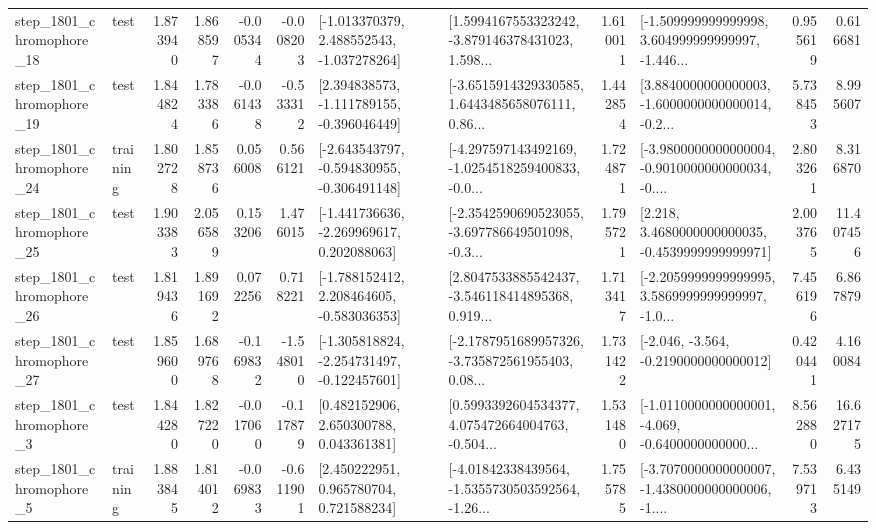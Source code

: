\begin{tabular}{llrrrrllrlrr}
 step\_1801\_chromophore\_18 &      test &      1.873940 &    1.868597 &     -0.005344 & -0.008203 &   [-1.013370379, 2.488552543, -1.037278264] &  [1.5994167553323242, -3.879146378431023, 1.598... &       1.610011 &  [-1.509999999999998, 3.604999999999997, -1.446... &            0.955619 &          0.616681 \\
 step\_1801\_chromophore\_19 &      test &      1.844824 &    1.783386 &     -0.061438 & -0.533312 &   [2.394838573, -1.111789155, -0.396046449] &  [-3.6515914329330585, 1.6443485658076111, 0.86... &       1.442854 &  [3.8840000000000003, -1.6000000000000014, -0.2... &            5.738453 &          8.995607 \\
 step\_1801\_chromophore\_24 &  training &      1.802728 &    1.858736 &      0.056008 &  0.566121 &  [-2.643543797, -0.594830955, -0.306491148] &  [-4.297597143492169, -1.0254518259400833, -0.0... &       1.724871 &  [-3.9800000000000004, -0.9010000000000034, -0.... &            2.803261 &          8.316870 \\
 step\_1801\_chromophore\_25 &      test &      1.903383 &    2.056589 &      0.153206 &  1.476015 &   [-1.441736636, -2.269969617, 0.202088063] &  [-2.3542590690523055, -3.697786649501098, -0.3... &       1.795721 &   [2.218, 3.4680000000000035, -0.4539999999999971] &            2.003765 &         11.407456 \\
 step\_1801\_chromophore\_26 &      test &      1.819436 &    1.891692 &      0.072256 &  0.718221 &   [-1.788152412, 2.208464605, -0.583036353] &  [2.8047533885542437, -3.546118414895368, 0.919... &       1.713417 &  [-2.2059999999999995, 3.5869999999999997, -1.0... &            7.456196 &          6.867879 \\
 step\_1801\_chromophore\_27 &      test &      1.859600 &    1.689768 &     -0.169832 & -1.548010 &  [-1.305818824, -2.254731497, -0.122457601] &  [-2.1787951689957326, -3.735872561955403, 0.08... &       1.731422 &              [-2.046, -3.564, -0.2190000000000012] &            0.420441 &          4.160084 \\
  step\_1801\_chromophore\_3 &      test &      1.844280 &    1.827220 &     -0.017060 & -0.117879 &     [0.482152906, 2.650300788, 0.043361381] &  [0.5993392604534377, 4.075472664004763, -0.504... &       1.531480 &  [-1.0110000000000001, -4.069, -0.6400000000000... &            8.562880 &         16.627175 \\
  step\_1801\_chromophore\_5 &  training &      1.883845 &    1.814012 &     -0.069833 & -0.611901 &     [2.450222951, 0.965780704, 0.721588234] &  [-4.01842338439564, -1.5355730503592564, -1.26... &       1.755785 &  [-3.7070000000000007, -1.4380000000000006, -1.... &            7.539713 &          6.435149 \\

\end{tabular}
